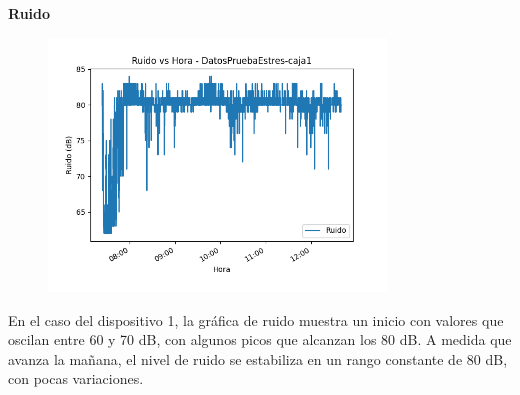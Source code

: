 \documentclass{templateNote}
\begin{document}
\textbf{Ruido}
\begin{figure}[H]
    \centering
    \includegraphics[width=0.8\textwidth]{img/DatosPruebaEstres-caja1_ruido_vs_hora.png}
\end{figure}

\begin{tcolorbox}
    En el caso del dispositivo 1, la gráfica de ruido muestra un inicio con valores que oscilan entre 60 y 70 dB, con algunos picos que alcanzan los 80 dB. A medida que avanza la mañana, el nivel de ruido se estabiliza en un rango constante de 80 dB, con pocas variaciones.
\end{tcolorbox}


\end{document}
